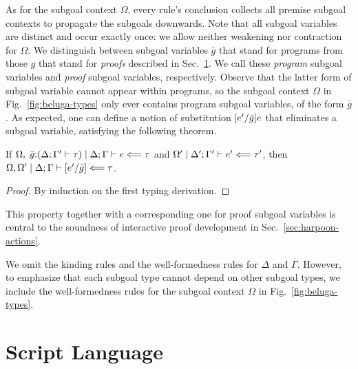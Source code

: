 As for the subgoal context $\Omega$, every rule's conclusion collects all
premise subgoal contexts to propagate the subgoals downwards.
Note that all subgoal variables are distinct and occur exactly once: we
allow neither weakening nor contraction for $\Omega$.
We distinguish between subgoal variables $\bar g$ that stand for programs from
those $g$ that stand for \emph{proofs} described in Sec.~\ref{sec:harpoon}.
We call these \emph{program} subgoal variables and \emph{proof} subgoal
variables, respectively.
Observe that the latter form of subgoal variable cannot appear within programs,
so the subgoal context $\Omega$ in Fig.~\ref{fig:beluga-types} only ever
contains program subgoal variables, of the form $\bar g$.
As expected, one can define a notion of substitution $[e^\prime/\bar g]e$
that eliminates a subgoal variable, satisfying the following theorem.

\begin{thm}
  If $\Omega,\; \bar g{:}(\Delta; \Gamma^\prime \vdash \tau)\mid\Delta; \Gamma \vdash e \Longleftarrow \tau$
  and $\Omega^\prime\mid\Delta^\prime; \Gamma^\prime \vdash e^\prime \Longleftarrow \tau^\prime$,
  then $\Omega,\Omega^\prime\mid\Delta; \Gamma \vdash [e^\prime/\bar g]\Longleftarrow \tau$.
\end{thm}

\begin{proof}
  By induction on the first typing derivation.
\end{proof}

This property together with a corresponding one for proof subgoal variables is
central to the soundness of interactive proof development in
Sec.~\ref{sec:harpoon-actions}.

We omit the kinding rules and the well-formedness rules for
$\Delta$ and $\Gamma$. However, to emphasize that each subgoal type
cannot depend on other subgoal types, we include the well-formedness
rules for the subgoal context $\Omega$ in Fig.~\ref{fig:beluga-types}.

\section{\Harpoon{} Script Language}
\label{sec:harpoon}

